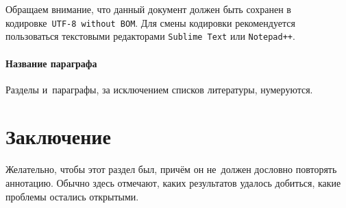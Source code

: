 \documentclass[12pt, twoside]{article}
\begin{document}
Обращаем внимание, что данный документ должен быть сохранен в кодировке~\verb'UTF-8 without BOM'.
Для смены кодировки рекомендуется пользоваться текстовыми редакторами \verb'Sublime Text' или \verb'Notepad++'.

\paragraph{Название параграфа}
Разделы и~параграфы, за исключением списков литературы, нумеруются.

\section{Заключение}
Желательно, чтобы этот раздел был, причём он не~должен дословно повторять аннотацию.
Обычно здесь отмечают, каких результатов удалось добиться, какие проблемы остались открытыми.
\end{document}
